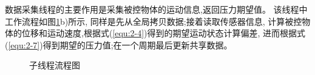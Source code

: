 数据采集线程的主要作用是采集被控物体的运动信息,返回压力期望值。
该线程中工作流程如图\ref{fig:3-2}b)所示, 同样是先从全局拷贝数据;接着读取传感器信息,
计算被控物体的位移和运动速度,根据式(\ref{equ:2-4})得到的期望运动状态计算偏差,
进而根据式(\ref{equ:2-7})得到期望的压力值;在一个周期最后更新共享数据。

\begin{figure}[!ht]
\centering
    \hspace{25pt}
  \caption{子线程流程图}
  \label{fig:3-2}
  \vspace{-0.3cm}
\end{figure}




